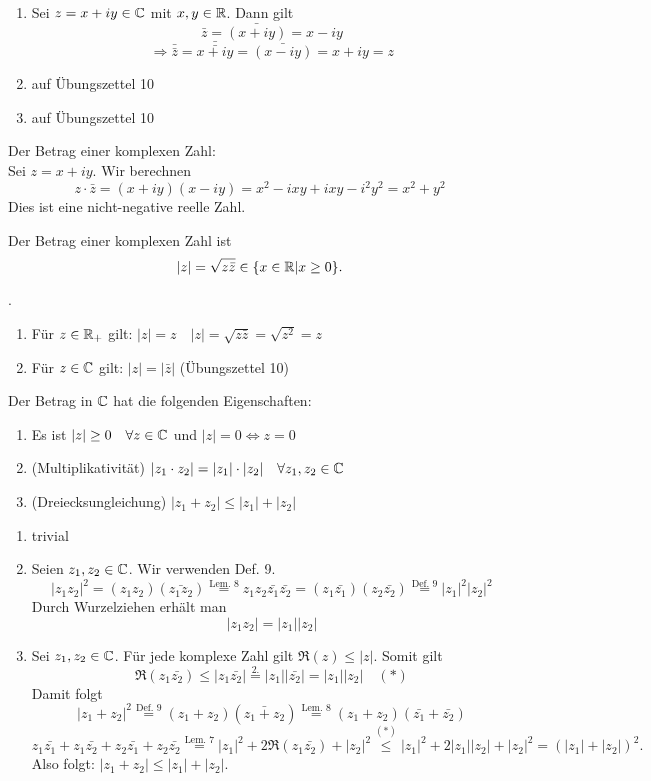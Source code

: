\documentclass[../ana1.tex]{subfiles}
\begin{document}
\begin{bew}
	\begin{enumerate}
		\item Sei \( z= x+iy \in\mathbb{C} \) mit \(x,y \in\mathbb{R} \). Dann gilt
		\[ \bar{z} = \bar{(x+iy)} = x-iy \]
		\[ \Rightarrow \bar{\bar{z}} = \bar{\bar{x+iy}} = \bar{(x-iy)} = x+iy = z \]
		\item auf Übungszettel 10
		\item auf Übungszettel 10
	\end{enumerate}
\end{bew}
Der Betrag einer komplexen Zahl:\\
Sei \( z=x+iy \). Wir berechnen
\[ z\cdot \bar{z} = (x+iy)(x-iy)=x^2-ixy +ixy - i^2y^2 = x^2 + y^2 \]
Dies ist eine nicht-negative reelle Zahl.
\begin{defi}
	Der Betrag einer komplexen Zahl ist
	\[ |z| = \sqrt{z \bar{z}}\in \{x\in\mathbb{R} | x\geq 0 \}. \]
\end{defi}
\begin{bem}.%
	\begin{enumerate}
		\item Für \( z\in\mathbb{R}_+ \) gilt: \( |z| = z \quad |z| = \sqrt{z\bar{z}} = \sqrt{z^2} = z \)
		\item Für \( z\in\mathbb{C} \) gilt: \( |z| = |\bar{z}| \) (Übungszettel 10)
	\end{enumerate}
\end{bem}
\begin{satz}
	Der Betrag in \(\mathbb{C} \) hat die folgenden Eigenschaften:
	\begin{enumerate}
		\item Es ist \( |z|\geq 0 \quad \forall z\in\mathbb{C} \) und \( |z|=0 \Leftrightarrow z=0 \)
		\item (Multiplikativität) \( |z_1 \cdot z_2| = |z_1|\cdot|z_2| \quad \forall z_1,z_2\in\mathbb{C} \)
		\item (Dreiecksungleichung) \( |z_1+z_2| \leq |z_1| + |z_2| \)
	\end{enumerate}
\end{satz}
\begin{bew}
	\begin{enumerate}
		\item trivial
		\item Seien \( z_1,z_2 \in\mathbb{C} \). Wir verwenden Def. 9.
		\[ |z_1z_2|^2 = (z_1z_2)(\bar{z_1z_2}) \overset{\text{Lem. 8}}{=}z_1z_2 \bar{z_1} \bar{z_2} = (z_1\bar{z_1})(z_2\bar{z_2}) \overset{\text{Def. 9}}{=} |z_1|^2|z_2|^2 \]
		Durch Wurzelziehen erhält man
		\[ |z_1z_2| = |z_1||z_2| \]
		\item Sei \( z_1,z_2 \in\mathbb{C} \). Für jede komplexe Zahl gilt \( \Re(z) \leq |z| \). Somit gilt
		\[ \Re(z_1\bar{z_2}) \leq |z_1\bar{z_2}| \overset{2.}{=}|z_1||\bar{z_2}| = |z_1||z_2| \quad(*) \]
		Damit folgt \[ |z_1 + z_2|^2 \overset{\text{Def. 9}}{=} (z_1 + z_2)(\bar{z_1+z_2}) \overset{\text{Lem. 8}}{=} (z_1 + z_2)(\bar{z_1} + \bar{z_2}) \]
		\[ z_1 \bar{z_1} + z_1 \bar{z_2} + z_2 \bar{z_1} + z_2 \bar{z_2} \overset{\text{Lem. 7}}{=} |z_1|^2 + 2\Re(z_1\bar{z_2}) + |z_2|^2 \overset{(*)}{\leq} |z_1|^2 + 2|z_1||z_2| + |z_2|^2 = {(|z_1| + |z_2|)}^2. \]
		Also folgt: \( |z_1+z_2| \leq |z_1| + |z_2|. \)
	\end{enumerate}
\end{bew}
\end{document}
